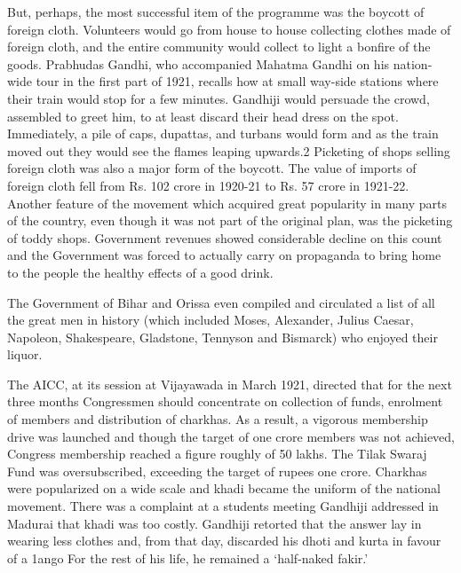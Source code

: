 But, perhaps, the most successful item of the programme was the boycott of foreign cloth. Volunteers would go from house to house collecting clothes made of foreign cloth, and the entire community would collect to light a bonfire of the goods. Prabhudas Gandhi, who accompanied Mahatma Gandhi on his nation-wide tour in the first part of 1921, recalls how at small way-side stations where their train would stop for a few minutes. Gandhiji would persuade the crowd, assembled to greet him, to at least discard their head dress on the spot. Immediately, a pile of caps, dupattas, and turbans would form and as the train moved out they would see the flames leaping upwards.2 Picketing of shops selling foreign cloth was also a major form of the boycott. The value of imports of foreign cloth fell from Rs. 102 crore in 1920-21 to Rs. 57 crore in 1921-22. Another feature of the movement which acquired great popularity in many parts of the country, even though it was not part of the original plan, was the picketing of toddy shops. Government revenues showed considerable decline on this count and the Government was forced to actually carry on propaganda to bring home to the people the healthy effects of a good drink. 

The Government of Bihar and Orissa even compiled and circulated a list of all the great men in history (which included Moses, Alexander, Julius Caesar, Napoleon, Shakespeare, Gladstone, Tennyson and Bismarck) who enjoyed their liquor. 

The AICC, at its session at Vijayawada in March 1921, directed that for the next three months Congressmen should concentrate on collection of funds, enrolment of members and distribution of charkhas. As a result, a vigorous membership drive was launched and though the target of one crore members was not achieved, Congress membership reached a figure roughly of 50 lakhs. The Tilak Swaraj Fund was oversubscribed, exceeding the target of rupees one crore. Charkhas were popularized on a wide scale and khadi became the uniform of the national movement. There was a complaint at a students meeting Gandhiji addressed in Madurai that khadi was too costly. Gandhiji retorted that the answer lay in wearing less clothes and, from that day, discarded his dhoti and kurta in favour of a 1ango For the rest of his life, he remained a `half-naked fakir.' 

